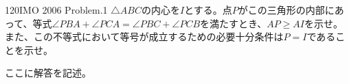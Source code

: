 \begin{prob}{120}{}{IMO 2006 Problem.1}
 $\triangle{ABC}$の内心を$I$とする。点$P$がこの三角形の内部にあって、等式$\angle{PBA}+\angle{PCA}=\angle{PBC}+\angle{PCB}$を満たすとき、$AP\ge AI$を示せ。また、この不等式において等号が成立するための必要十分条件は$P=I$であることを示せ。
\end{prob}
ここに解答を記述。